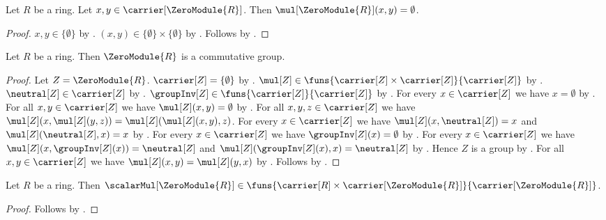 \begin{proposition}\label{zero_module_addition}
    Let $R$ be a ring.
    Let $x,y\in\carrier[\ZeroModule{R}]$.
    Then $\mul[\ZeroModule{R}](x,y)=\emptyset$.
\end{proposition}
\begin{proof}
    $x,y\in\{\emptyset\}$ by .
    $(x,y)\in\{\emptyset\}\times\{\emptyset\}$ by
        .
    Follows by .
\end{proof}

\begin{proposition}\label{zero_module_is_commutative_group}
    Let $R$ be a ring.
    Then $\ZeroModule{R}$ is a commutative group.
\end{proposition}
\begin{proof}
    Let $Z=\ZeroModule{R}$.
    $\carrier[Z]=\{\emptyset\}$ by .
    $\mul[Z]\in
        \funs{\carrier[Z]\times\carrier[Z]}{\carrier[Z]}$ by
        .
    $\neutral[Z]\in\carrier[Z]$ by
        .
    $\groupInv[Z]\in\funs{\carrier[Z]}{\carrier[Z]}$ by
        .
    For every $x\in\carrier[Z]$ we have $x=\emptyset$ by
        .
    For all $x,y\in\carrier[Z]$ we have
        $\mul[Z](x,y)=\emptyset$ by .
    For all $x,y,z\in\carrier[Z]$ we have
        $\mul[Z](x,\mul[Z](y,z))
            =\mul[Z](\mul[Z](x,y),z)$.
    For every $x\in\carrier[Z]$ we have
        $\mul[Z](x,\neutral[Z])=x$ and
        $\mul[Z](\neutral[Z],x)=x$ by
        .
    For every $x\in\carrier[Z]$ we have
        $\groupInv[Z](x)=\emptyset$ by
        .
    For every $x\in\carrier[Z]$ we have
        $\mul[Z](x,\groupInv[Z](x))=\neutral[Z]$ and
        $\mul[Z](\groupInv[Z](x),x)=\neutral[Z]$ by
        .
    Hence $Z$ is a group by
        .
    For all $x,y\in\carrier[Z]$ we have
        $\mul[Z](x,y)=\mul[Z](y,x)$ by
        .
    Follows by .
\end{proof}

\begin{proposition}\label{zero_module_scalar_graph}
    Let $R$ be a ring.
    Then $\scalarMul[\ZeroModule{R}]\in
        \funs{\carrier[R]\times\carrier[\ZeroModule{R}]}{
            \carrier[\ZeroModule{R}]}$.
\end{proposition}
\begin{proof}
    Follows by
        .
\end{proof}

